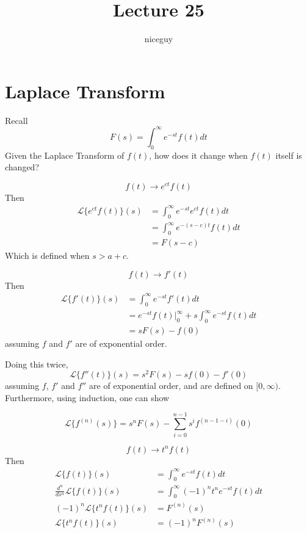 \documentclass[12pt]{article}
\author{niceguy}
\title{Lecture 25}
\begin{document}
\maketitle

\section{Laplace Transform}

Recall
$$F(s) = \int_0^\infty e^{-st}f(t)dt$$
Given the Laplace Transform of $f(t)$, how does it change when $f(t)$ itself is changed?
\begin{ex}
	$$f(t) \rightarrow e^{ct}f(t)$$
	Then
	\begin{align*}
		\mathcal{L}\{e^{ct}f(t)\}(s) &= \int_0^\infty e^{-st}e^{ct}f(t)dt \\
					  &= \int_0^\infty e^{-(s-c)t}f(t)dt \\
					  &= F(s-c)
	\end{align*}
	Which is defined when $s>a+c$.
\end{ex}

\begin{ex}
	$$f(t) \rightarrow f'(t)$$
	Then
	\begin{align*}
		\mathcal{L}\{f'(t)\}(s) &= \int_0^\infty e^{-st}f'(t)dt \\
					&= e^{-st}f(t) \Big |_0^\infty + s\int_0^\infty e^{-st}f(t)dt \\
					&= sF(s) - f(0)
	\end{align*}
	assuming $f$ and $f'$ are of exponential order.
\end{ex}

Doing this twice,
$$\mathcal{L}\{f''(t)\}(s) = s^2F(s) - sf(0) - f'(0)$$
assuming $f$, $f'$ and $f''$ are of exponential order, and are defined on $[0,\infty)$. Furthermore, using induction, one can show

$$\mathcal{L}\{f^{(n)}(s)\} = s^nF(s) - \sum_{i=0}^{n-1} s^if^{(n-1-i)}(0)$$

\begin{ex}
	$$f(t) \rightarrow t^nf(t)$$
	Then
	\begin{align*}
		\mathcal{L}\{f(t)\}(s) &= \int_0^\infty e^{-st}f(t)dt \\
		\frac{d^n}{ds^n}\mathcal{L}\{f(t)\}(s) &= \int_0^\infty (-1)^nt^ne^{-st}f(t)dt \\
		(-1)^n\mathcal{L}\{t^nf(t)\}(s) &= F^{(n)}(s) \\
		\mathcal{L}\{t^nf(t)\}(s) &= (-1)^nF^{(n)}(s)
	\end{align*}
\end{ex}
\end{document}
